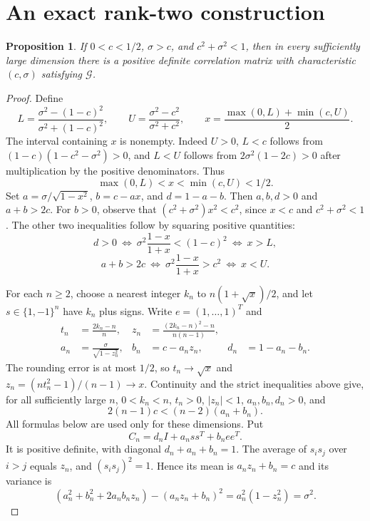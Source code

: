 \documentclass[11pt]{article}
\newtheorem{proposition}[theorem]{Proposition}
\newcommand{\G}{\mathcal G}
\begin{document}
\section{An exact rank-two construction}
\begin{proposition}\label{prop:construction}
If $0<c<1/2$, $\sigma>c$, and $c^2+\sigma^2<1$, then in every
sufficiently large dimension there is a positive definite correlation
matrix with characteristic $(c,\sigma)$ satisfying $\G$.
\end{proposition}
\begin{proof}
Define
\[
 L=\frac{\sigma^2-(1-c)^2}{\sigma^2+(1-c)^2},\qquad
 U=\frac{\sigma^2-c^2}{\sigma^2+c^2},\qquad
 x=\frac{\max(0,L)+\min(c,U)}2.
\]
The interval containing $x$ is nonempty. Indeed $U>0$,
$L<c$ follows from $(1-c)(1-c^2-\sigma^2)>0$, and
$L<U$ follows from $2\sigma^2(1-2c)>0$ after multiplication by
the positive denominators. Thus
\begin{equation}\label{eq:interval}
 \max(0,L)<x<\min(c,U)<1/2.
\end{equation}
Set $a=\sigma/\sqrt{1-x^2}$, $b=c-ax$, and $d=1-a-b$.
Then $a,b,d>0$ and $a+b>2c$.
For $b>0$, observe that
$(c^2+\sigma^2)x^2<c^2$, since $x<c$ and $c^2+\sigma^2<1$.
The other two inequalities follow by squaring positive quantities:
\[
 d>0\ \Longleftrightarrow\
 \sigma^2\frac{1-x}{1+x}<(1-c)^2\ \Longleftrightarrow\ x>L,
\]
\[
 a+b>2c\ \Longleftrightarrow\
 \sigma^2\frac{1-x}{1+x}>c^2\ \Longleftrightarrow\ x<U.
\]

For each $n\ge2$, choose a nearest integer $k_n$ to
$n(1+\sqrt{x})/2$, and let $s\in\{1,-1\}^n$ have $k_n$ plus
signs. Write $e=(1,\ldots,1)^T$ and
\begin{align*}
 t_n&=\frac{2k_n-n}{n},&
 z_n&=\frac{(2k_n-n)^2-n}{n(n-1)},\\
 a_n&=\frac{\sigma}{\sqrt{1-z_n^2}},&
 b_n&=c-a_nz_n,& d_n&=1-a_n-b_n.
\end{align*}
The rounding error is at most $1/2$, so $t_n\to\sqrt{x}$ and
$z_n=(nt_n^2-1)/(n-1)\to x$.
Continuity and the strict inequalities above give, for all sufficiently
large $n$, $0<k_n<n$, $t_n>0$, $|z_n|<1$, $a_n,b_n,d_n>0$, and
\begin{equation}\label{eq:finitegap}
 2(n-1)c<(n-2)(a_n+b_n).
\end{equation}
All formulas below are used only for these dimensions. Put
\begin{equation}\label{eq:matrix}
 C_n=d_n I+a_nss^T+b_nee^T.
\end{equation}
It is positive definite, with diagonal $d_n+a_n+b_n=1$.
The average of $s_is_j$ over $i>j$ equals $z_n$, and
$(s_is_j)^2=1$. Hence its mean is $a_nz_n+b_n=c$ and its variance is
\[
 (a_n^2+b_n^2+2a_nb_nz_n)-(a_nz_n+b_n)^2
 =a_n^2(1-z_n^2)=\sigma^2.
\]


\end{proof}
\end{document}
